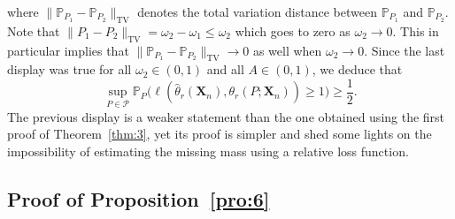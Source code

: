 \documentclass{article}
\newcommand{\1}{\boldsymbol{1}}
\newcommand{\PP}{\mathbb{P}}
\theoremstyle{plain}
\begin{document}
where $\|\PP_{P_1} - \PP_{P_2}\|_{\textrm{TV}}$ denotes the total variation distance between $\PP_{P_1}$ and $\PP_{P_2}$. Note that $\|P_1 - P_2\|_{\textrm{TV}} = \omega_2 - \omega_1 \leq \omega_2$ which goes to zero as $\omega_2 \to 0$. This in particular implies that $\|\PP_{P_1} - \PP_{P_2}\|_{\textrm{TV}}\to 0$ as well when $\omega_2 \to 0$. Since the last display was true for all $\omega_2 \in (0,1)$ and all $A\in (0,1)$, we deduce that
\begin{equation*}
  \sup_{P\in \mathcal{P}}\PP_P\Big(%
  \ell(\hat{\theta}_r(\mathbf{X}_n),\theta_r(P;\mathbf{X}_n)) \geq 1
  \Big) \geq \frac{1}{2}.
\end{equation*}
The previous display is a weaker statement than the one obtained using the first proof of Theorem~\ref{thm:3}, yet its proof is simpler and shed some lights on the impossibility of estimating the missing mass using a relative loss function.

\subsection{Proof of Proposition~\ref{pro:6}}
\label{sec:proof-pro:6}
\end{document}
